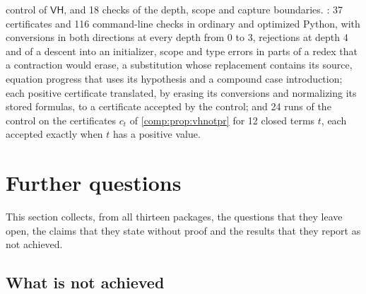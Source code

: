 control of $\mathsf{VH}$, and 18 checks of the depth, scope and capture
boundaries. : 37 certificates and 116 command-line
checks in ordinary and optimized Python, with conversions in both directions
at every depth from $0$ to $3$, rejections at depth $4$ and of a descent into
an initializer, scope and type errors in parts of a redex that a contraction
would erase, a substitution whose replacement contains its source, equation
progress that uses its hypothesis and a compound case introduction; each
positive certificate translated, by erasing its conversions and normalizing
its stored formulas, to a certificate accepted by the control; and 24 runs
of the control on the certificates $c_t$ of \cref{comp:prop:vhnotpr} for 12
closed terms $t$, each accepted exactly when $t$ has a positive value.

\section{Further questions}
\label{comp:sec:questions}

This section collects, from all thirteen packages, the questions that they
leave open, the claims that they state without proof and the results that
they report as not achieved.

\subsection{What is not achieved}


